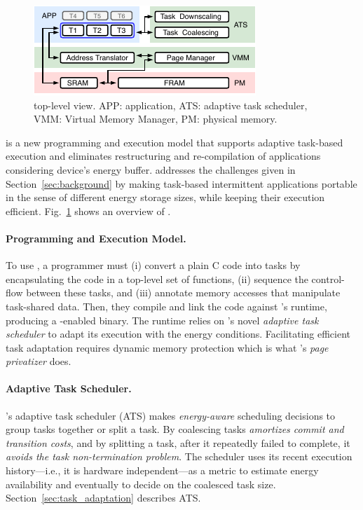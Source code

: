 \begin{figure}
	\centering
	\includegraphics[width=\columnwidth]{figures/system-overview.pdf}
	\caption{\sys top-level view. APP: application, ATS: adaptive task scheduler, VMM: Virtual Memory Manager, PM: physical memory.}
	\label{fig:system_overview}
\end{figure}

\sys is a new programming and execution model that supports adaptive task-based execution and eliminates restructuring and re-compilation of applications considering device's energy buffer. \sys addresses the challenges given in Section~\ref{sec:background} by making task-based intermittent applications portable in the sense of different energy storage sizes, while keeping their execution efficient. Fig.~\ref{fig:system_overview} shows an overview of \sys.

\paragraph{Programming and Execution Model.}
To use \sys, a programmer must (i) convert a plain C code into tasks by encapsulating the code in a top-level set of functions, (ii) sequence the control-flow between these tasks, and (iii) annotate memory accesses that manipulate task-shared data. Then, they compile and link the code against \sys's runtime, producing a \sys-enabled binary. The runtime relies on \sys's novel {\em adaptive task scheduler} to adapt its execution with the energy conditions. Facilitating efficient task adaptation requires dynamic memory protection which is what \sys's \emph{page privatizer} does. 

\paragraph{Adaptive Task Scheduler.}
\sys's adaptive task scheduler (ATS) makes \emph{energy-aware} scheduling decisions to group tasks together or split a task. By coalescing tasks \sys \emph{amortizes commit and transition costs}, and by splitting a task, after it repeatedly failed to complete, it \emph{avoids the task non-termination problem}. The scheduler uses its recent execution history---i.e., it is hardware independent---as a metric to estimate energy availability and eventually to decide on the coalesced task size. Section~\ref{sec:task_adaptation} describes ATS.

